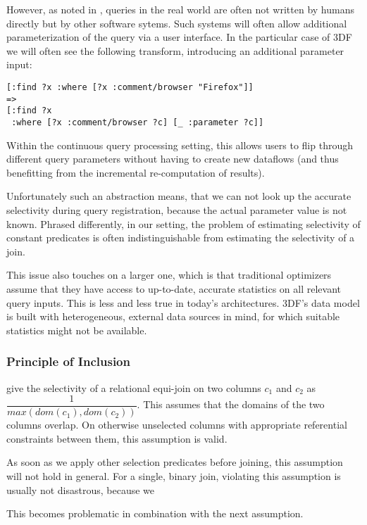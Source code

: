 \documentclass[../index.tex]{subfiles}
\begin{document}
However, as noted in \cite{lohman2014query}, queries in the real world
are often not written by humans directly but by other software
sytems. Such systems will often allow additional parameterization of
the query via a user interface. In the particular case of 3DF we will
often see the following transform, introducing an additional parameter
input:

\begin{verbatim}
[:find ?x :where [?x :comment/browser "Firefox"]]
=>
[:find ?x 
 :where [?x :comment/browser ?c] [_ :parameter ?c]]
\end{verbatim}

Within the continuous query processing setting, this allows users to
flip through different query parameters without having to create new
dataflows (and thus benefitting from the incremental re-computation of
results).

Unfortunately such an abstraction means, that we can not look up the
accurate selectivity during query registration, because the actual
parameter value is not known. Phrased differently, in our setting, the
problem of estimating selectivity of constant predicates is often
indistinguishable from estimating the selectivity of a join.

This issue also touches on a larger one, which is that traditional
optimizers assume that they have access to up-to-date, accurate
statistics on all relevant query inputs. This is less and less true in
today's architectures. 3DF's data model is built with heterogeneous,
external data sources in mind, for which suitable statistics might not
be available.

\subsubsection{Principle of Inclusion}

\cite{selinger1979access} give the selectivity of a relational
equi-join on two columns $c_1$ and $c_2$ as
$\dfrac{1}{max(dom(c_1),dom(c_2))}$. This assumes that the domains of
the two columns overlap. On otherwise unselected columns with
appropriate referential constraints between them, this assumption is
valid.

As soon as we apply other selection predicates before joining, this
assumption will not hold in general. For a single, binary join,
violating this assumption is usually not disastrous, because we 

This becomes problematic in
combination with the next assumption.
\end{document}
